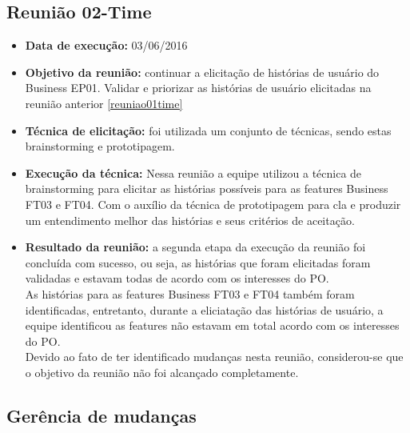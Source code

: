 \subsection{Reunião 02-Time}
\begin{itemize}
 \item \textbf{Data de execução:} 03/06/2016
 \item \textbf{Objetivo da reunião:} continuar a elicitação de histórias de usuário do Business EP01. Validar e priorizar as histórias de usuário elicitadas na reunião anterior \ref{reuniao01time}
 \item \textbf{Técnica de elicitação:} foi utilizada um conjunto de técnicas, sendo estas brainstorming e prototipagem.
 \item \textbf{Execução da técnica:} Nessa reunião a equipe utilizou a técnica de brainstorming para elicitar as histórias possíveis para as features Business FT03 e FT04. Com o auxílio da técnica de prototipagem para cla e produzir um entendimento melhor das histórias e seus critérios de aceitação.

 \item \textbf{Resultado da reunião:} a segunda etapa da execução da reunião foi concluída com sucesso, ou seja, as histórias que foram elicitadas foram validadas e estavam todas de acordo com os interesses do PO.\\
 As histórias para as features Business FT03 e FT04 também foram identificadas, entretanto, durante a eliciatação das histórias de usuário, a equipe identificou as features não estavam em total acordo com os interesses do PO.\\
 Devido ao fato de ter identificado mudanças nesta reunião, considerou-se que o objetivo da reunião não foi alcançado completamente.\\
\end{itemize}

\subsection{Gerência de mudanças}

